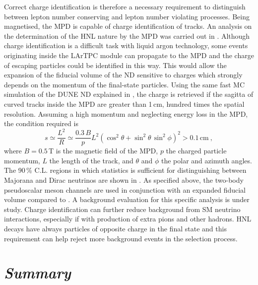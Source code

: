 Correct charge identification is therefore a necessary requirement to distinguish between %
lepton number conserving and lepton number violating processes.
Being magnetised, the MPD is capable of charge identification of tracks.
An analysis on the determination of the HNL nature by the MPD was carried out in .
Although charge identification is a difficult task with liquid argon technology, %
some events originating inside the LArTPC module can propagate to the MPD and the charge %
of escaping particles could be identified in this way.
This would allow the expansion of the fiducial volume of the ND sensitive to charges which strongly %
depends on the momentum of the final-state particles.
Using the same fast MC simulation of the DUNE ND explained in , %
the charge is retrieved if the sagitta of curved tracks inside the MPD are greater than 1\,cm, %
hundred times the spatial resolution.
Assuming a high momentum and neglecting energy loss in the MPD, the condition required is 
\begin{equation}
	s \simeq \frac{L^2}{R} \simeq \frac{0.3\,B}{p} L^2 %
	(\cos^2\theta + \sin^2\theta\, \sin^2\phi)^2 > 0.1\,\text{cm}\ ,
\end{equation}
where $B = 0.5$\,T is the magnetic field of the MPD, $p$ the charged particle momentum, %
$L$ the length of the track, and $\theta$ and $\phi$ the polar and azimuth angles.
The 90\,\% C.L. regions in which statistics is sufficient for distinguishing between Majorana and Dirac neutrinos %
are shown in .
As specified above, the two-body pseudoscalar meson channels are used in conjunction with an expanded fiducial volume %
compared to .
A background evaluation for this specific analysis is under study.
Charge identification can further reduce background from SM neutrino interactions, %
especially if with production of extra pions and other hadrons.
HNL decays have always particles of opposite charge in the final state and this requirement %
can help reject more background events in the selection process.

\section*{\em Summary}

